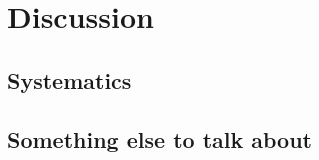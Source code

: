 \section{Discussion}
\label{sec:discussion}
\subsection{Systematics}
\label{sec:systematics}
\subsection{Something else to talk about}